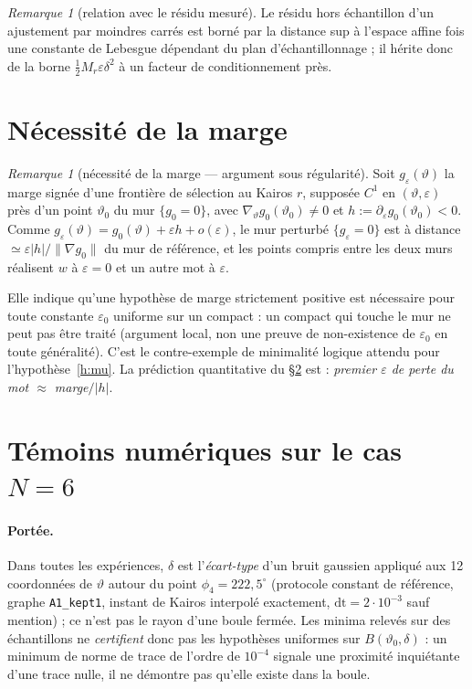 \documentclass[11pt,a4paper]{article}
\theoremstyle{remark}
\newtheorem{remarque}[theoreme]{Remarque}
\theoremstyle{definition}
\newcommand{\eps}{\varepsilon}
\newcommand{\vth}{\vartheta}
\begin{document}
\begin{remarque}[relation avec le résidu mesuré]
Le résidu hors échantillon d'un ajustement par moindres carrés est borné par la distance sup à l'espace affine fois une constante de Lebesgue dépendant du plan d'échantillonnage ; il hérite donc de la borne $\tfrac12M_r\eps\delta^2$ à un facteur de conditionnement près.
\end{remarque}

\section{Nécessité de la marge}

\begin{remarque}[nécessité de la marge --- argument sous régularité]\label{rem:marge}
Soit $g_\eps(\vth)$ la marge signée d'une frontière de sélection au Kairos $r$, supposée $C^1$ en $(\vth,\eps)$ près d'un point $\vth_0$ du mur $\{g_0=0\}$, avec $\nabla_\vth g_0(\vth_0)\ne0$ et $h:=\partial_\eps g_0(\vth_0)<0$. Comme $g_\eps(\vth)=g_0(\vth)+\eps h+o(\eps)$, le mur perturbé $\{g_\eps=0\}$ est à distance $\simeq\eps|h|/\lVert\nabla g_0\rVert$ du mur de référence, et les points compris entre les deux murs réalisent $w$ à $\eps=0$ et un autre mot à $\eps$.
\end{remarque}
Elle indique qu'une hypothèse de marge strictement positive est nécessaire pour toute constante $\eps_0$ uniforme sur un compact : un compact qui touche le mur ne peut pas être traité (argument local, non une preuve de non-existence de $\eps_0$ en toute généralité). C'est le contre-exemple de minimalité logique attendu pour l'hypothèse~\ref{h:mu}. La prédiction quantitative du §\ref{sec:num} est : \emph{premier $\eps$ de perte du mot $\approx$ marge$/\lvert h\rvert$}.

\section{Témoins numériques sur le cas $N=6$}\label{sec:num}

\paragraph{Portée.} Dans toutes les expériences, $\delta$ est l'\emph{écart-type} d'un bruit gaussien appliqué aux 12 coordonnées de $\vth$ autour du point $\phi_4=222{,}5^\circ$ (protocole constant de référence, graphe \texttt{A1\_kept1}, instant de Kairos interpolé exactement, $\mathrm{dt}=2\cdot10^{-3}$ sauf mention) ; ce n'est pas le rayon d'une boule fermée. Les minima relevés sur des échantillons ne \emph{certifient} donc pas les hypothèses uniformes sur $B(\vth_0,\delta)$ : un minimum de norme de trace de l'ordre de $10^{-4}$ signale une proximité inquiétante d'une trace nulle, il ne démontre pas qu'elle existe dans la boule.
\end{document}
